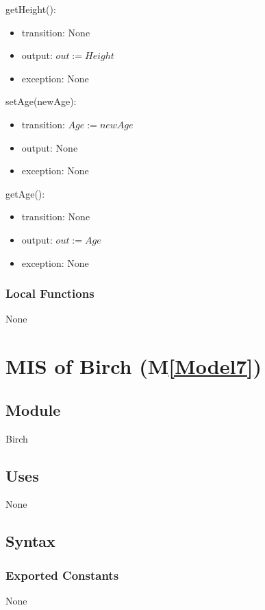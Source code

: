 \documentclass[12pt, titlepage]{article}
\newcommand{\mref}[1]{M\ref{#1}}
\begin{document}
\noindent getHeight():
\begin{itemize}
\item transition: None
\item output: $\mathit{out := Height}$
\item exception: None
\end{itemize}
\noindent setAge(newAge):
\begin{itemize}
\item transition: $\mathit{Age := newAge}$
\item output: None
\item exception: None
\end{itemize}
\noindent getAge():
\begin{itemize}
\item transition: None
\item output: $\mathit{out := Age}$
\item exception: None
\end{itemize}

\subsubsection{Local Functions}
None

\newpage

\renewcommand{\tn}{Birch }
\renewcommand{\tmn}{Birch}
\renewcommand{\constn}{Birch}

\section{MIS of \tn (\mref{Model7})}

\subsection{Module}
\tmn

\subsection{Uses}
None

\subsection{Syntax}
\subsubsection{Exported Constants}
None
\end{document}
